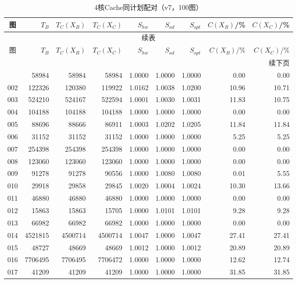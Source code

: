 \begin{longtable}{crrrrrrrr}
\caption{4核Cache同计划配对（v7，100图）}\label{tab:cache-detail-4}\\
\toprule
图 & $T_B$ & $T_C(X_B)$ & $T_C(X_C)$ & $S_{hw}$ & $S_{ad}$ & $S_{opt}$ & $C(X_B)$/\% & $C(X_C)$/\% \\
\midrule
\endfirsthead
\multicolumn{9}{c}{续表}\\
\toprule
图 & $T_B$ & $T_C(X_B)$ & $T_C(X_C)$ & $S_{hw}$ & $S_{ad}$ & $S_{opt}$ & $C(X_B)$/\% & $C(X_C)$/\% \\
\midrule
\endhead
\midrule\multicolumn{9}{r}{续下页}\\
\endfoot
\bottomrule
\endlastfoot
001 & 58984 & 58984 & 58984 & 1.0000 & 1.0000 & 1.0000 & 0.00 & 0.00 \\
002 & 122326 & 120380 & 119922 & 1.0162 & 1.0038 & 1.0200 & 10.96 & 10.71 \\
003 & 524210 & 524167 & 522594 & 1.0001 & 1.0030 & 1.0031 & 11.83 & 10.75 \\
004 & 104188 & 104188 & 104188 & 1.0000 & 1.0000 & 1.0000 & 0.00 & 0.00 \\
005 & 88696 & 88666 & 86911 & 1.0003 & 1.0202 & 1.0205 & 11.84 & 11.84 \\
006 & 31152 & 31152 & 31152 & 1.0000 & 1.0000 & 1.0000 & 5.25 & 5.25 \\
007 & 254398 & 254398 & 254398 & 1.0000 & 1.0000 & 1.0000 & 0.00 & 0.00 \\
008 & 123060 & 123060 & 123060 & 1.0000 & 1.0000 & 1.0000 & 0.00 & 0.00 \\
009 & 91278 & 91278 & 90556 & 1.0000 & 1.0080 & 1.0080 & 0.01 & 5.55 \\
010 & 29918 & 29858 & 29845 & 1.0020 & 1.0004 & 1.0024 & 10.30 & 13.66 \\
011 & 46880 & 46880 & 46880 & 1.0000 & 1.0000 & 1.0000 & 0.00 & 0.00 \\
012 & 15863 & 15863 & 15705 & 1.0000 & 1.0101 & 1.0101 & 9.28 & 9.28 \\
013 & 66982 & 66982 & 66982 & 1.0000 & 1.0000 & 1.0000 & 0.00 & 0.00 \\
014 & 4521815 & 4500714 & 4500714 & 1.0047 & 1.0000 & 1.0047 & 27.41 & 27.41 \\
015 & 48727 & 48669 & 48669 & 1.0012 & 1.0000 & 1.0012 & 20.89 & 20.89 \\
016 & 7706495 & 7706495 & 7706472 & 1.0000 & 1.0000 & 1.0000 & 12.62 & 12.74 \\
017 & 41209 & 41209 & 41209 & 1.0000 & 1.0000 & 1.0000 & 31.85 & 31.85 \\

\end{longtable}
